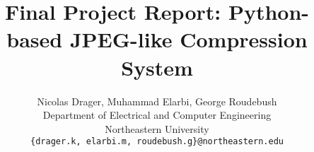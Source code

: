 \documentclass[10pt,twocolumn,letterpaper]{article}
\title{Final Project Report: Python-based JPEG-like Compression System}
\author{
Nicolas Drager, Muhammad Elarbi, George Roudebush\\
Department of Electrical and Computer Engineering\\
Northeastern University\\
\texttt{\{drager.k, elarbi.m, roudebush.g\}@northeastern.edu}
}
\begin{document}
\maketitle
    




{
    \small
    
    
}

% 
\end{document}
